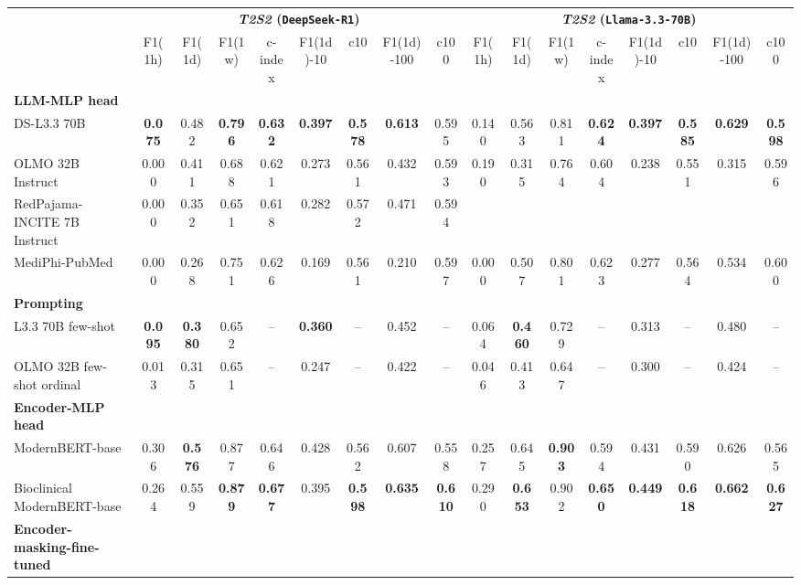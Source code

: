 \begin{table}[!htbp]
\centering
\resizebox{\linewidth}{!}
{
\begin{tabular}{lcccccccc|cccccccc}
\toprule
& \multicolumn{8}{c|}{\textbf{\textit{T2S2} (\texttt{DeepSeek-R1})}} & \multicolumn{8}{c}{\textbf{\textit{T2S2} (\texttt{Llama-3.3-70B})}} \\
& F1(1h) & F1(1d) & F1(1w) & c-index & F1(1d)-10 & c10 & F1(1d)-100 & c100 & F1(1h) & F1(1d) & F1(1w) & c-index & F1(1d)-10 & c10 & F1(1d)-100 & c100 \\
\hline
\textbf{LLM-MLP head} &&&&&&&&&&&&&&&&\\
DS-L3.3 70B & \textbf{0.075} & 0.482 & \textbf{0.796} & \textbf{0.632} & \textbf{0.397} & \textbf{0.578} & \textbf{0.613} & 0.595 & 0.140 & 0.563 & 0.811 & \textbf{0.624} & \textbf{0.397} & \textbf{0.585} & \textbf{0.629} & \textbf{0.598} \\
OLMO 32B Instruct & 0.000 & 0.411 & 0.688 & 0.621 & 0.273 & 0.561 & 0.432 & 0.593 & 0.190 & 0.315 & 0.764 & 0.604 & 0.238 & 0.551 & 0.315 & 0.596 \\
RedPajama-INCITE 7B Instruct & 0.000 & 0.352 & 0.651 & 0.618 & 0.282 & 0.572 & 0.471 & 0.594 \\
MediPhi-PubMed & 0.000 & 0.268 & 0.751 & 0.626 & 0.169 & 0.561 & 0.210 & 0.597 & 0.000 & 0.507 & 0.801 & 0.623 & 0.277 & 0.564 & 0.534 & 0.600 \\ 
\textbf{Prompting} &&&&&&&&&&&&&&&&\\
L3.3 70B few-shot & \textbf{0.095} & \textbf{0.380} & 0.652 & -- & \textbf{0.360} & -- & 0.452 & -- & 0.064 & \textbf{0.460} & 0.729 & -- & 0.313 & -- & 0.480 & -- \\
OLMO 32B few-shot ordinal & 0.013 & 0.315 & 0.651 & -- & 0.247 & -- & 0.422 & -- & 0.046 & 0.413 & 0.647 & -- & 0.300 & -- & 0.424 & -- \\
\hline
\textbf{Encoder-MLP head} &&&&&&&&&&&&&&&&\\
ModernBERT-base & 0.306 & \textbf{0.576} & 0.877 & 0.646 & 0.428 & 0.562 & 0.607 & 0.558 & 0.257 & 0.645 & \textbf{0.903} & 0.594 & 0.431 & 0.590 & 0.626 & 0.565 \\
Bioclinical ModernBERT-base & 0.264 & 0.559 & \textbf{0.879} & \textbf{0.677} & 0.395 & \textbf{0.598} & \textbf{0.635} & \textbf{0.610} & 0.290 & \textbf{0.653} & 0.902 & \textbf{0.650}
& \textbf{0.449} & \textbf{0.618} & \textbf{0.662} & \textbf{0.627} \\ 
\hline
\textbf{Encoder-masking-fine-tuned} &&&&&&&&&&&&&&&&\\

\end{tabular}}
\end{table}
